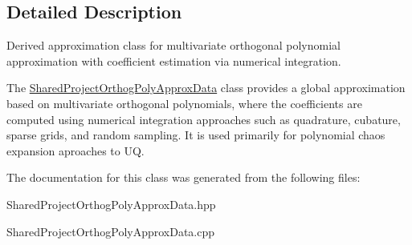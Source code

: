 \subsection{Detailed Description}
Derived approximation class for multivariate orthogonal polynomial approximation with coefficient estimation via numerical integration. 

The \hyperlink{classPecos_1_1SharedProjectOrthogPolyApproxData}{Shared\+Project\+Orthog\+Poly\+Approx\+Data} class provides a global approximation based on multivariate orthogonal polynomials, where the coefficients are computed using numerical integration approaches such as quadrature, cubature, sparse grids, and random sampling. It is used primarily for polynomial chaos expansion aproaches to UQ. 

The documentation for this class was generated from the following files\+:\begin{DoxyCompactItemize}
\item 
Shared\+Project\+Orthog\+Poly\+Approx\+Data.\+hpp\item 
Shared\+Project\+Orthog\+Poly\+Approx\+Data.\+cpp\end{DoxyCompactItemize}
